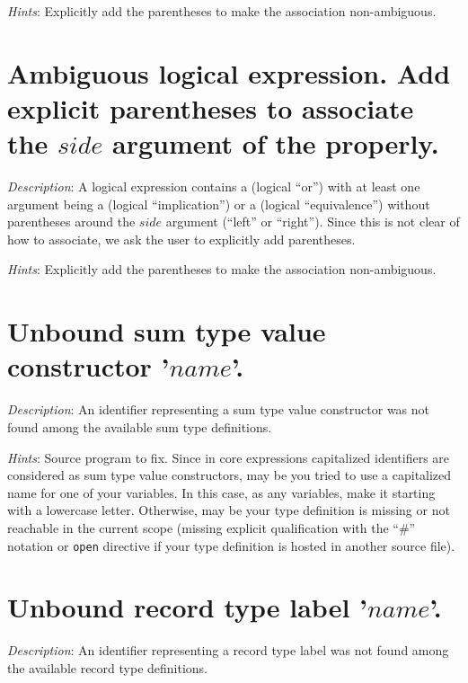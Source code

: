 {\em Hints}: Explicitly add the parentheses to make the association
non-ambiguous.



\section*{Ambiguous logical expression. Add explicit parentheses to
  associate the $side$ argument of the \terminal{\backslash/} properly.}
{\em Description}: A logical expression contains a
\terminal{\backslash/} (logical ``or'') with at least one argument being a
\terminal{->} (logical ``implication'') or a \terminal{<->} (logical
``equivalence'') without parentheses around the $side$ argument (``left''
or ``right''). Since this is not clear of how to associate, we  ask
the user to explicitly add parentheses.

{\em Hints}: Explicitly add the parentheses to make the association
non-ambiguous.



\section*{Unbound sum type value constructor '$name$'.}
{\em Description}: An identifier representing a sum type value constructor
was not found among the available sum type definitions.

{\em Hints}: Source program to fix. Since in core expressions
capitalized identifiers are considered as sum type value constructors,
may be you tried to use a capitalized name for one of your
variables. In this case, as any variables, make it starting with a
lowercase letter. Otherwise, may be your type definition is missing or
not reachable in the current scope (missing explicit qualification
with the ``\#'' notation or {\tt open} directive if your type
definition is hosted in another source file).



\section*{Unbound record type label '$name$'.}
{\em Description}: An identifier representing a record type label
was not found among the available record type definitions.

